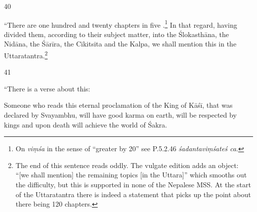 \begin{translation}

\item [40] 

“There are one hundred and twenty chapters in five
.\footnote{On \emph{viṃśa} in the sense of
    “greater by 20” see P.5.2.46 \emph{śadantaviṃśateś ca}.}  In that
    regard, having divided them, according to their subject matter, into
    the Ślokasthāna, the Nidāna, the Śārīra, the Cikitsita and the Kalpa,
    we shall mention this in the Uttaratantra.\footnote{The end of this
        sentence reads oddly.  The vulgate edition adds an object: “[we shall
        mention] the remaining topics [in the Uttara]” which smooths out the
        difficulty, but this is supported in none of the Nepalese MSS.  At
        the start of the Uttaratantra \citep[1.3--4ab]{vulgate} there is
        indeed a statement that picks up the point about there being 120
        chapters.}


\item[41]    

“There is a verse about this:
\begin{sloka}
    Someone who reads this eternal proclamation of the King of
    Kāśī, that was declared by Svayambhu, will have good karma on earth, will
    be respected by kings and upon death will achieve the world of Śakra.
\end{sloka}

\end{translation}    
